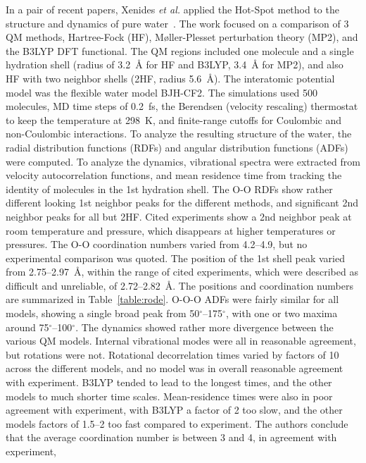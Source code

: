 \documentclass[11pt]{revtex4}
\begin{document}
In a pair of recent papers, Xenides {\it et al.} applied the Hot-Spot
method to the structure and dynamics of pure
water~\cite{xenides_j_chem_phys_2005a,xenides_j_mol_liq_2006a}.
The work focused on a comparison of 3 QM methods, Hartree-Fock (HF),
M{\o}ller-Plesset perturbation theory (MP2), and the B3LYP DFT functional.
The QM regions included one molecule and a single hydration shell
(radius of 3.2~{\AA} for HF and B3LYP, 3.4~{\AA} for MP2), and also
HF with two neighbor shells (2HF, radius 5.6~{\AA}).  The interatomic
potential model was the flexible water model BJH-CF2.  The simulations
used 500 molecules, MD time steps of 0.2~fs, the Berendsen (velocity
rescaling) thermostat to keep the temperature at 298~K, and 
finite-range cutoffs for Coulombic and non-Coulombic interactions.  To analyze
the resulting structure of the water, the radial distribution
functions (RDFs) and angular distribution functions (ADFs) were
computed.  To analyze the dynamics, vibrational spectra were extracted
from velocity autocorrelation functions, and mean residence time
from tracking the identity of molecules in the 1st hydration shell.
The O-O RDFs show rather different looking 1st neighbor peaks for
the different methods, and significant 2nd neighbor peaks for all
but 2HF.  Cited experiments show a 2nd neighbor peak at room
temperature and pressure, which disappears at higher temperatures
or pressures.  The O-O coordination numbers varied from 4.2--4.9,
but no experimental comparison was quoted.  The position of the 1st
shell peak varied from 2.75--2.97~{\AA}, within the range of cited
experiments, which were described as difficult and unreliable, of
2.72--2.82~{\AA}.  The positions and coordination numbers are
summarized in Table~\ref{table:rode}.
O-O-O ADFs were fairly similar for all models,
showing a single broad peak from 50$^\circ$--175$^\circ$, with one
or two maxima around 75$^\circ$--100$^\circ$.  The dynamics showed
rather more divergence between the various QM models.  Internal
vibrational modes were all in reasonable agreement, but rotations
were not.  Rotational decorrelation times varied by factors of 10
across the different models, and no model was in overall reasonable
agreement with experiment.  B3LYP tended to lead to the longest
times, and the other models to much shorter time scales.  Mean-residence
times were also in poor agreement with experiment, with B3LYP a
factor of 2 too slow, and the other models factors of 1.5--2 too
fast compared to experiment.  The authors conclude that the average
coordination number is between 3 and 4, in agreement with experiment,
\end{document}
